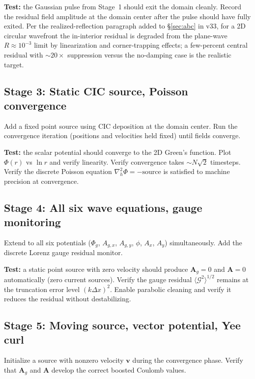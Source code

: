 \documentclass[11pt,a4paper]{article}
\newcommand{\vv}[1]{\mathbf{#1}}
\newcommand{\Phig}{\Phi_g}
\newcommand{\Ag}{\vv{A}_g}
\begin{document}
\textbf{Test:} the Gaussian pulse from Stage~1 should exit the domain cleanly.  Record the residual field amplitude at the domain center after the pulse should have fully exited.  Per the realized-reflection paragraph added to §\ref{sec:abc} in v33, for a 2D circular wavefront the in-interior residual is degraded from the plane-wave $R\approx10^{-3}$ limit by linearization and corner-trapping effects; a few-percent central residual with $\sim20\times$ suppression versus the no-damping case is the realistic target.

\subsection{Stage 3: Static CIC source, Poisson convergence}

Add a fixed point source using CIC deposition at the domain center.  Run the convergence iteration (positions and velocities held fixed) until fields converge.

\textbf{Test:} the scalar potential should converge to the 2D Green's function.  Plot $\Phi(r)$ vs $\ln r$ and verify linearity.  Verify convergence takes $\sim N\sqrt{2}$ timesteps.  Verify the discrete Poisson equation $\nabla^2_{h}\Phi = -\mathrm{source}$ is satisfied to machine precision at convergence.

\subsection{Stage 4: All six wave equations, gauge monitoring}

Extend to all six potentials ($\Phig$, $A_{g,x}$, $A_{g,y}$, $\phi$, $A_x$, $A_y$) simultaneously.  Add the discrete Lorenz gauge residual monitor.

\textbf{Test:} a static point source with zero velocity should produce $\Ag = 0$ and $\vv{A} = 0$ automatically (zero current sources).  Verify the gauge residual $\langle\mathcal{G}^2\rangle^{1/2}$ remains at the truncation error level $(k\Delta x)^2$.  Enable parabolic cleaning and verify it reduces the residual without destabilizing.

\subsection{Stage 5: Moving source, vector potential, Yee curl}

Initialize a source with nonzero velocity $\vv{v}$ during the convergence phase.  Verify that $\Ag$ and $\vv{A}$ develop the correct boosted Coulomb values.
\end{document}
